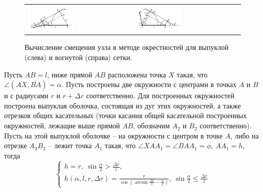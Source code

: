 \documentclass[
11pt,%
tightenlines,%
twoside,%
onecolumn,%
nofloats,%
nobibnotes,%
nofootinbib,%
superscriptaddress,%
noshowpacs,%
centertags]%
{revtex4}
\begin{document}
\begin{figure}[ht]
\setcaptionmargin{5mm}
\onelinecaptionsfalse %
\begin{tabular}{ll}
\includegraphics[width=0.45\textwidth]{pics/accuracy_okrestnost.pdf}
&
\includegraphics[width=0.45\textwidth]{pics/accuracy_okrestnost2.pdf}
\end{tabular}
\caption{Вычисление смещения узла в методе окрестностей для выпуклой (слева) и вогнутой (справа) сетки.}
\label{fig:text_1_remesh_2d_accuracy_okrestnost}
\end{figure}

\begin{lemma}\label{lem:text_1_remesh_2d_accuracy_okrestnost}
Пусть $AB = l$, ниже прямой $AB$ расположена точка $X$ такая, что $\angle (\overline{AX}, \overline{BA}) = \alpha$.
Пусть построены две окружности с центрами в точках $A$ и $B$ и с радиусами $r$ и $r + \Delta r$ соответственно.
Для построенных окружностей построена выпуклая оболочка, состоящая из дуг этих окружностей, а также отрезков общих касательных (точки касания общей касательной построенных окружностей, лежащие выше прямой $AB$, обозначим $A_2$ и $B_2$ соответственно).
Пусть на этой выпуклой оболочке -- на окружности с центром в точке $A$, либо на отрезке $A_2B_2$ -- лежит точка $A_1$ такая, что $\angle XAA_1 = \angle BAA_1 = \phi$, $AA_1 = h$, тогда 
\begin{equation}
	\begin{cases}\label{eqn:text_1_remesh_2d_okr_h}
		h = r, \  \sin \frac{\alpha}{2} > \frac{\Delta r}{l}, \\
		h(\alpha, l, r, \Delta r) = \frac{r}{\cos \left( \arcsin \frac{\Delta r}{l} - \frac{\alpha}{2} \right)}, \  \sin \frac{\alpha}{2} \le \frac{\Delta r}{l}
	\end{cases}
\end{equation}
\end{lemma}
\end{document}
